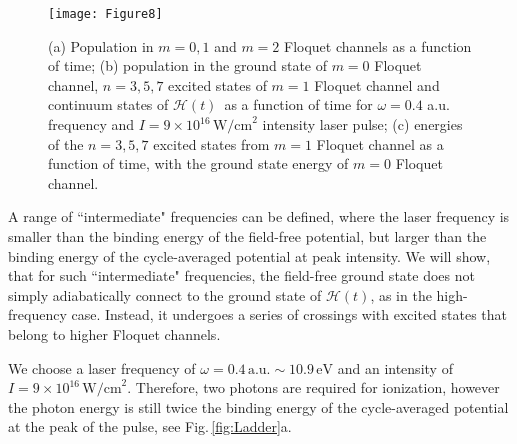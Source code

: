 \documentclass[
pra%
,preprint%
,amssymb, nobibnotes, aps, superscriptaddress, floatfix]{revtex4}
\newcommand{\fig}{Fig.\,}
\newcommand{\CAHt}{$\mathcal{H}(t)$}
\begin{document}
\begin{figure}
	\centering
	\texttt{[image: Figure8]}
	\caption{(a) Population in $m=0, 1$ and $m=2$ Floquet channels as a function of time; 
	(b) population in the ground state of $m=0$ Floquet channel, $n=3, 5, 7$ excited states of $m=1$ Floquet channel and continuum states of \CAHt\ as a function of time for $\omega=0.4$ a.u. frequency and $I=9 \times 10^{16} \, \text{W/cm}^2$ intensity laser pulse; (c) energies of the $n=3, 5, 7$ excited states from $m=1$ Floquet channel as a function of time, with the ground state energy of $m=0$ Floquet channel.}
	\label{fig:Triplet_w041_5fs_a10}
\end{figure}

%
%

A range of ``intermediate" frequencies can be defined, where the laser frequency is smaller than the binding energy of the field-free potential, but larger than the binding energy of the cycle-averaged potential at peak intensity. We will show, that for such ``intermediate" frequencies, the field-free ground state does not simply adiabatically connect to the ground state of \CAHt, as in the high-frequency case. Instead, it undergoes a series of crossings with excited states that belong to higher Floquet channels. 

We choose a laser frequency of $\omega = 0.4 \, \text{a.u.} \sim 10.9 \, \text{eV}$ and an intensity of $I= 9 \times 10^{16} \, \text{W/cm}^2$. Therefore, two photons are required for ionization, however the photon energy is still twice the binding energy of the cycle-averaged potential at the peak of the pulse, see \fig \ref{fig:Ladder}a.
\end{document}
